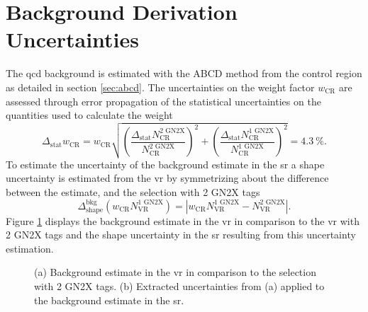 \section{Background Derivation Uncertainties}\label{sec:bkg_uncertainties}
The \ac{qcd} background is estimated with the ABCD method from the control region as detailed in section \ref{sec:abcd}. The uncertainties on the weight factor $w_\text{CR}$ are assessed through error propagation of the statistical uncertainties on the quantities used to calculate the weight
\begin{equation}
    \Delta_\text{stat} w_\text{CR} = w_\text{CR} \sqrt{
        \left(\frac{\Delta_\text{stat} N_\text{CR}^\text{2 GN2X}}{N_\text{CR}^\text{2 GN2X}}\right)^2
        +
        \left(\frac{\Delta_\text{stat} N_\text{CR}^\text{1 GN2X}}{N_\text{CR}^\text{1 GN2X}}\right)^2
    }
    = \qty[]{4.3}{\percent}.
\end{equation}
To estimate the uncertainty of the background estimate in the \ac{sr} a shape uncertainty is estimated from the \ac{vr} by symmetrizing about the difference between the estimate, and the selection with 2 GN2X tags
\begin{equation}
    \Delta_\text{shape}^\text{bkg} \left( w_\text{CR}N_\text{VR}^\text{1 GN2X}\right)= \left| w_\text{CR}N_\text{VR}^\text{1 GN2X} - N_\text{VR}^\text{2 GN2X}\right|.
\end{equation}
Figure \ref{fig:bkg_shape_estimate} displays the background estimate in the \ac{vr} in comparison to the \ac{vr} with 2 GN2X tags and the shape uncertainty in the \ac{sr} resulting from this uncertainty estimation.
\begin{figure}
    \centering
    \caption[]{(a) Background estimate in the \ac{vr} in comparison to the selection with 2 GN2X tags. (b) Extracted uncertainties from (a) applied to the background estimate in the \ac{sr}.}
    \label{fig:bkg_shape_estimate}
\end{figure}


